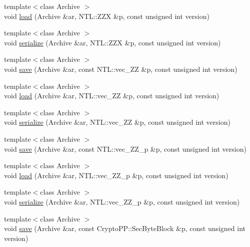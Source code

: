 \begin{DoxyCompactItemize}
\item 
{\footnotesize template$<$class Archive $>$ }\\void \hyperlink{namespaceboost_1_1serialization_a7b78d5cf4b5caa328bef6a087fbaff9c}{load} (Archive \&ar, N\+T\+L\+::\+Z\+ZX \&p, const unsigned int version)
\item 
{\footnotesize template$<$class Archive $>$ }\\void \hyperlink{namespaceboost_1_1serialization_a0734cf2ae9e8ce324e5d26bdea7afd70}{serialize} (Archive \&ar, N\+T\+L\+::\+Z\+ZX \&p, const unsigned int version)
\item 
{\footnotesize template$<$class Archive $>$ }\\void \hyperlink{namespaceboost_1_1serialization_a58966b07928230bb0400b6117217baa1}{save} (Archive \&ar, const N\+T\+L\+::vec\+\_\+\+ZZ \&p, const unsigned int version)
\item 
{\footnotesize template$<$class Archive $>$ }\\void \hyperlink{namespaceboost_1_1serialization_a020abf1a3721352f3f93367e476adb75}{load} (Archive \&ar, N\+T\+L\+::vec\+\_\+\+ZZ \&p, const unsigned int version)
\item 
{\footnotesize template$<$class Archive $>$ }\\void \hyperlink{namespaceboost_1_1serialization_aeb170b7c609eb6350c2bcf3331d6f140}{serialize} (Archive \&ar, N\+T\+L\+::vec\+\_\+\+ZZ \&p, const unsigned int version)
\item 
{\footnotesize template$<$class Archive $>$ }\\void \hyperlink{namespaceboost_1_1serialization_acd0cd0062652d786e7d0d108a7844d1c}{save} (Archive \&ar, const N\+T\+L\+::vec\+\_\+\+Z\+Z\+\_\+p \&p, const unsigned int version)
\item 
{\footnotesize template$<$class Archive $>$ }\\void \hyperlink{namespaceboost_1_1serialization_afd8ccb691b59647d2c043b64fe0ea28d}{load} (Archive \&ar, N\+T\+L\+::vec\+\_\+\+Z\+Z\+\_\+p \&p, const unsigned int version)
\item 
{\footnotesize template$<$class Archive $>$ }\\void \hyperlink{namespaceboost_1_1serialization_a7b255d9449f6f4f7b5e3ca7c054cb2c3}{serialize} (Archive \&ar, N\+T\+L\+::vec\+\_\+\+Z\+Z\+\_\+p \&p, const unsigned int version)
\item 
{\footnotesize template$<$class Archive $>$ }\\void \hyperlink{namespaceboost_1_1serialization_a435bf2f49b7036c361876e915fed6b53}{save} (Archive \&ar, const Crypto\+P\+P\+::\+Sec\+Byte\+Block \&p, const unsigned int version)

\end{DoxyCompactItemize}
